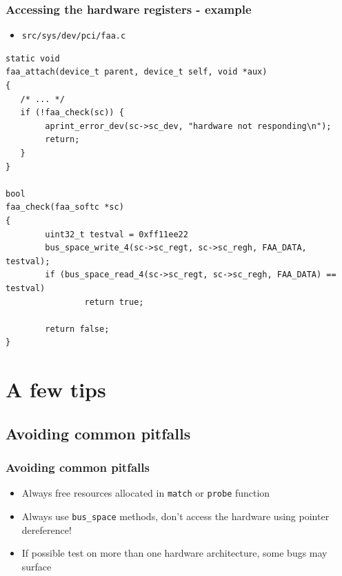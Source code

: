 \documentclass[dvipsnames,table]{beamer}
\begin{document}
\begin{frame}[fragile]
\frametitle{Accessing the hardware registers - example}
\begin{itemize}
	\item {\tt src/sys/dev/pci/faa.c}
\end{itemize}
\begin{lstlisting}
static void
faa_attach(device_t parent, device_t self, void *aux)
{
   /* ... */
   if (!faa_check(sc)) {
   		aprint_error_dev(sc->sc_dev, "hardware not responding\n");
        return;
   }
}

bool
faa_check(faa_softc *sc) 
{
        uint32_t testval = 0xff11ee22
        bus_space_write_4(sc->sc_regt, sc->sc_regh, FAA_DATA, testval);
        if (bus_space_read_4(sc->sc_regt, sc->sc_regh, FAA_DATA) == testval)
                return true;

        return false;
}
\end{lstlisting}
\end{frame}



\section{A few tips}

\subsection{Avoiding common pitfalls}

\begin{frame}
\frametitle{Avoiding common pitfalls}

\begin{itemize}
	\item Always free resources allocated in {\tt match} or {\tt probe} function
	\item Always use {\tt bus\_space} methods, don't access the hardware using pointer dereference!
	\item If possible test on more than one hardware architecture, some bugs may surface
\end{itemize}
\end{frame}
\end{document}

